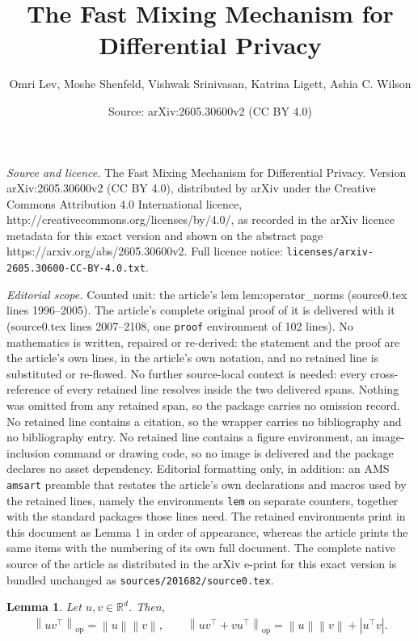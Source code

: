 \documentclass[10pt,a4paper]{amsart}
\title{The Fast Mixing Mechanism for Differential Privacy}
\author{Omri Lev, Moshe Shenfeld, Vishwak Srinivasan, Katrina Ligett, Ashia C. Wilson}
\date{Source: arXiv:2605.30600v2 (CC BY 4.0)}
\newtheorem{lem}{Lemma}
\newcommand{\Norm}[1]{\left\| #1 \right\|}
\newcommand{\abs}[1]{\left| #1 \right|}
\providecommand{\norm}[1]{\Norm{#1}}
\newcommand{\reals}{\mathbb{R}}
\begin{document}
\maketitle

\noindent\emph{Source and licence.} The Fast Mixing Mechanism for Differential Privacy. Version arXiv:2605.30600v2 (CC BY 4.0), distributed by arXiv under the Creative Commons Attribution 4.0 International licence, http://creativecommons.org/licenses/by/4.0/, as recorded in the arXiv licence metadata for this exact version and shown on the abstract page https://arxiv.org/abs/2605.30600v2. Full licence notice: \texttt{licenses/arxiv-2605.30600-CC-BY-4.0.txt}.\par\smallskip

\noindent\textit{Editorial scope.} Counted unit: the article's lem lem:operator\_norms (source0.tex lines 1996--2005). The article's complete original proof of it is delivered with it (source0.tex lines 2007--2108, one \texttt{proof} environment of 102 lines). No mathematics is written, repaired or re-derived: the statement and the proof are the article's own lines, in the article's own notation, and no retained line is substituted or re-flowed.  No further source-local context is needed: every cross-reference of every retained line resolves inside the two delivered spans.  Nothing was omitted from any retained span, so the package carries no omission record.  No retained line contains a citation, so the wrapper carries no bibliography and no bibliography entry.  No retained line contains a figure environment, an image-inclusion command or drawing code, so no image is delivered and the package declares no asset dependency.  Editorial formatting only, in addition: an AMS \texttt{amsart} preamble that restates the article's own declarations and macros used by the retained lines, namely the environments \texttt{lem} on separate counters, together with the standard packages those lines need.  The retained environments print in this document as Lemma 1 in order of appearance, whereas the article prints the same items with the numbering of its own full document.  The complete native source of the article as distributed in the arXiv e-print for this exact version is bundled unchanged as \texttt{sources/201682/source0.tex}.
\begin{lem}
    \label{lem:operator_norms}
    Let $u,v\in\reals^{d}$. Then,
    \begin{align}
        \norm{uv^{\top}}_{\mathrm{op}} = \norm{u}\norm{v},
        \qquad
        \norm{uv^{\top} + vu^{\top}}_{\mathrm{op}}
        = \norm{u}\norm{v} + \abs{u^{\top}v}.
    \end{align}
\end{lem}
\end{document}
